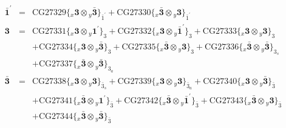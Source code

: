 \documentclass[english]{article}
\newcommand{\rep}[1]{\mathbf{#1}}
\newcommand{\repx}[2]{{}_{#2}\mathbf{#1}}
\newcommand{\subcg}[3]{\big\{ \repx{#1}{x}\otimes\repx{#2}{y}\big\}^{}_{#3}}
\begin{document}
\begin{itemize}
\begin{eqnarray*}
\rep{\bar{1}^{\prime}} &=& \text{CG27329}\subcg{3}{\bar{3}}{\bar{1}^{\prime}}+\text{CG27330}\subcg{\bar{3}}{3}{\bar{1}^{\prime}}
\\
\rep{3} &=& \text{CG27331}\subcg{3}{1^{\prime}}{3}+\text{CG27332}\subcg{3}{\bar{1}^{\prime}}{3}+\text{CG27333}\subcg{3}{3}{3} \\ 
 & & +\text{CG27334}\subcg{3}{\bar{3}}{3}+\text{CG27335}\subcg{\bar{3}}{3}{3}+\text{CG27336}\subcg{\bar{3}}{\bar{3}}{3_{s}} \\ 
 & & +\text{CG27337}\subcg{\bar{3}}{\bar{3}}{3_{a}}
\\
\rep{\bar{3}} &=& \text{CG27338}\subcg{3}{3}{\bar{3}_{s}}+\text{CG27339}\subcg{3}{3}{\bar{3}_{a}}+\text{CG27340}\subcg{3}{\bar{3}}{\bar{3}} \\ 
 & & +\text{CG27341}\subcg{\bar{3}}{1^{\prime}}{\bar{3}}+\text{CG27342}\subcg{\bar{3}}{\bar{1}^{\prime}}{\bar{3}}+\text{CG27343}\subcg{\bar{3}}{3}{\bar{3}} \\ 
 & & +\text{CG27344}\subcg{\bar{3}}{\bar{3}}{\bar{3}}
\end{eqnarray*}
\end{itemize}
\end{document}
